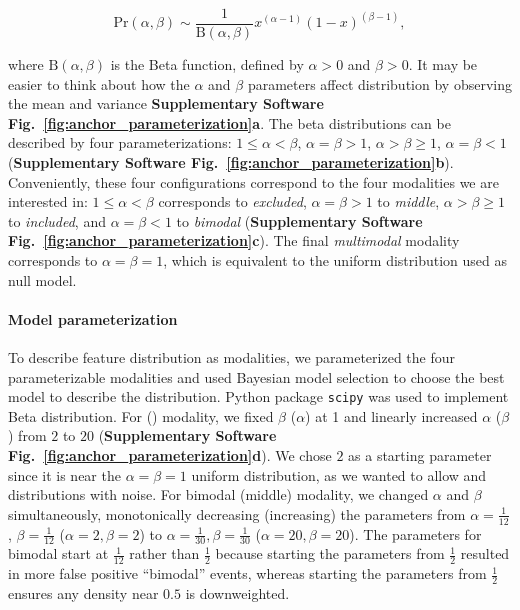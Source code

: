 \begin{equation}
\mathrm{Pr}(\alpha, \beta) \sim \frac{1}{\mathrm{B}\left(\alpha, \beta\right)}  x^{(\alpha - 1)} \left(1-x\right)^{(\beta-1)},
\end{equation}

where $\mathrm{B}\left(\alpha, \beta\right)$ is the Beta function, defined by $\alpha > 0$ and $\beta > 0$. It may be easier to think about how the $\alpha$ and $\beta$ parameters affect distribution by observing the mean and variance \textbf{Supplementary Software Fig.~\ref{fig:anchor_parameterization}a}. The beta distributions can be described by four parameterizations: $1 \leq \alpha < \beta$, $\alpha = \beta > 1$, $\alpha > \beta \geq 1$, $\alpha = \beta < 1$ (\textbf{Supplementary Software Fig.~\ref{fig:anchor_parameterization}b}). Conveniently, these four configurations correspond to the four modalities we are interested in: $1 \leq \alpha < \beta$ corresponds to \emph{excluded}, $\alpha = \beta > 1$ to \emph{middle}, $\alpha > \beta \geq 1$ to \emph{included}, and $\alpha = \beta < 1$ to \emph{bimodal} (\textbf{Supplementary Software Fig.~\ref{fig:anchor_parameterization}c}). The final \emph{multimodal} modality corresponds to $\alpha = \beta = 1$, which is equivalent to the uniform distribution used as null model.



\paragraph{Model parameterization}
To describe feature distribution as modalities, we parameterized the four parameterizable modalities and used Bayesian model selection to choose the best model to describe the distribution. Python package \texttt{scipy}\cite{Oliphant:2007dm,Millman:2011jv} was used to implement Beta distribution.
For \1 (\0) modality, we fixed $\beta$ ($\alpha$) at 1 and linearly increased $\alpha$ ($\beta$) from $2$ to $20$ (\textbf{Supplementary Software Fig.~\ref{fig:anchor_parameterization}d}). We chose $2$ as a starting parameter since it is near the $\alpha=\beta=1$ uniform distribution, as we wanted to allow \0 and \1 distributions with noise. For bimodal (middle) modality, we changed $\alpha$ and $\beta$ simultaneously, monotonically decreasing (increasing) the parameters from $\alpha=\frac{1}{12}$, $\beta = \frac{1}{12}$ ($\alpha = 2, \beta = 2$) to $\alpha = \frac{1}{30}, \beta = \frac{1}{30}$ ($\alpha = 20, \beta=20$). The parameters for bimodal start at $\frac{1}{12}$ rather than $\frac{1}{2}$ because starting the parameters from $\frac{1}{2}$ resulted in more false positive ``bimodal'' events, whereas starting the parameters from $\frac{1}{2}$ ensures any density near $0.5$ is downweighted.



